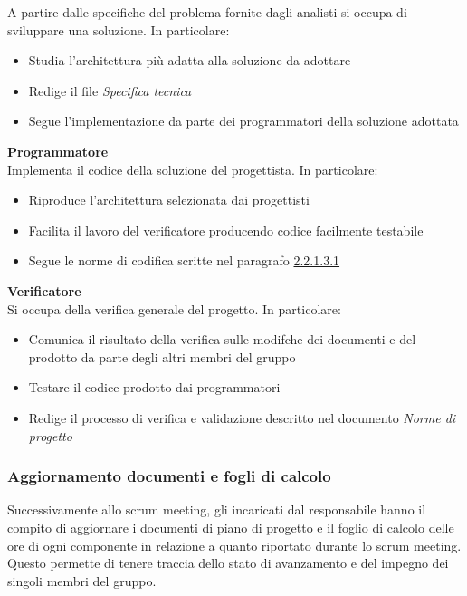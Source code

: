 \documentclass[12pt]{article}
\begin{document}
A partire dalle specifiche del problema fornite dagli analisti si occupa di sviluppare una soluzione. In particolare:
\begin{itemize}
    \item Studia l'architettura più adatta alla soluzione da adottare
    \item Redige il file \textit{Specifica tecnica}
    \item Segue l'implementazione da parte dei programmatori della soluzione adottata
\end{itemize}
\textbf{Programmatore}\\
Implementa il codice della soluzione del progettista. In particolare:
\begin{itemize}
    \item Riproduce l'architettura selezionata dai progettisti
    \item Facilita il lavoro del verificatore producendo codice facilmente testabile
    \item Segue le norme di codifica scritte nel paragrafo \hyperref[StileCodifica]{2.2.1.3.1}
\end{itemize}
\textbf{Verificatore}\\
Si occupa della verifica generale del progetto. In particolare:
\begin{itemize}
    \item Comunica il risultato della verifica sulle modifche dei documenti e del prodotto da parte degli altri membri del gruppo
    \item Testare il codice prodotto dai programmatori
    \item Redige il processo di verifica e validazione descritto nel documento \textit{Norme di progetto}
\end{itemize}

\subsubsection{Aggiornamento documenti e fogli di calcolo}
Successivamente allo scrum meeting, gli incaricati dal responsabile hanno il compito di aggiornare i documenti di piano di progetto e il foglio di calcolo delle ore di ogni componente in relazione a quanto riportato durante lo scrum meeting. 
Questo permette di tenere traccia dello stato di avanzamento e del impegno dei singoli membri del gruppo.
\end{document}
